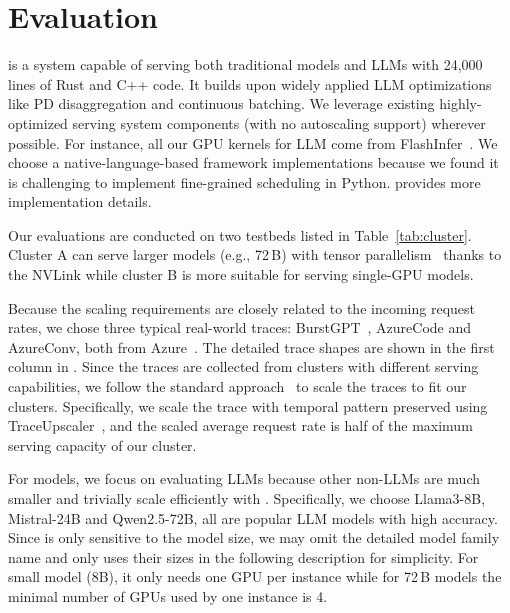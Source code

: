 \section{Evaluation}
\label{sec:eval}

{\sys} is a {\maas} system capable of serving both traditional models and LLMs
with 24,000 lines of Rust and C++ code.
It builds upon widely applied LLM optimizations like PD disaggregation and continuous batching.
We leverage existing highly-optimized serving system components (with no autoscaling support) wherever possible.
For instance,
all our GPU kernels for LLM come from FlashInfer~\cite{flashinfer}.
We choose a native-language-based framework implementations because we found 
it is challenging to implement fine-grained scheduling in Python.
\textsection{\ref{sec:appendix}} provides more implementation details.




Our evaluations are conducted on two testbeds listed in Table~\ref{tab:cluster}.
Cluster A can serve larger models (e.g., 72\,B) with tensor parallelism~\cite{vllm}
thanks to the NVLink 
while cluster B is more suitable for serving single-GPU models. 

Because the scaling requirements are closely related to the incoming request rates,
we chose three typical real-world traces:
BurstGPT~\cite{wang2024burstgpt},
AzureCode and AzureConv, both from Azure~\cite{DBLP:conf/isca/PatelCZSGMB24}.
The detailed trace shapes are shown in the first column in {}.
Since the traces are collected from clusters with different serving capabilities,
we follow the standard approach~\cite{DBLP:conf/asplos/MiaoSDXL0J24,DBLP:journals/pvldb/AliPYS22,DBLP:conf/osdi/GujaratiKAHKVM20}
to scale the traces to fit our clusters.
Specifically, we scale the trace with temporal pattern preserved using
TraceUpscaler~\cite{traceupscaler},
and the scaled 
average request rate is half of the maximum serving capacity of our cluster.


For models, we focus on evaluating LLMs because other non-LLMs
are much smaller and trivially scale efficiently with {\sys}.
Specifically,
we choose Llama3-8B, Mistral-24B and Qwen2.5-72B,
all are popular LLM models with high accuracy.
Since {\sys} is only sensitive to the model size,
we may omit the detailed model family name and only uses their sizes
in the following description for simplicity.
For small model (8B), it only needs one GPU per instance while
for 72\,B models the minimal number of GPUs used by one instance is 4.

